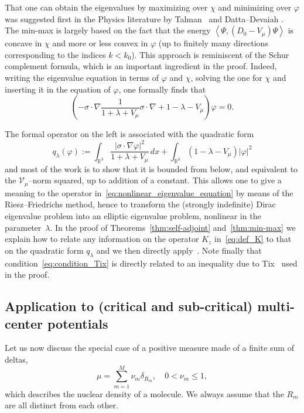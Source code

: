 \documentclass[AHL,Unicode,published]{cedram}
\newcommand{\R}{\mathbb{R}}
\newcommand{\cV}{\mathcal{V}}
\newcommand\1{{\ensuremath {\mathds 1} }}
\renewcommand\phi{\varphi}
\newcommand\pscal[1]{{\ensuremath{\left\langle #1 \right\rangle}}}
\renewcommand{\leq}{\leqslant}
\begin{document}
\goodbreak
\noindent That one can obtain the eigenvalues by maximizing over $\chi$ and minimizing over $\phi$ was suggested first in the Physics literature by Talman~\cite{Talman-86} and Datta--Devaiah \cite{DatDev-88}. The min-max is largely based on the fact that the energy $\pscal{\Psi,(D_0-V_\mu)\Psi}$ is concave in $\chi$ and more or less convex in $\phi$ (up to finitely many directions corresponding to the indices $k<k_0$). This approach is reminiscent of the Schur complement formula, which is an important ingredient in the proof. Indeed, writing the eigenvalue equation in terms of $\phi$ and $\chi$, solving the one for $\chi$ and inserting it in the equation of $\phi$, one formally finds that
\begin{equation}\label{eq:nonlinear_eigenvalue_equation}
\left(-\sigma\cdot \nabla\frac{1}{1+\lambda+V_\mu}\sigma\cdot \nabla+1-\lambda-V_\mu\right)\phi=0.
\end{equation}

The formal operator on the left is associated with the quadratic form
\begin{equation}\label{eq:def_q_lambda}
q_\lambda(\phi):=\int_{\R^3}\frac{|\sigma\cdot\nabla\phi|^2}{1+\lambda+V_\mu}\,dx+\int_{\R^3}\left(1-\lambda-V_\mu\right)|\phi|^2
\end{equation}
and most of the work is to show that it is bounded from below, and equivalent to the $\cV_\mu$--norm squared, up to addition of a constant. This allows one to give a meaning to the operator in~\eqref{eq:nonlinear_eigenvalue_equation} by means of the Riesz--Friedrichs method, hence to transform the (strongly indefinite) Dirac eigenvalue problem into an elliptic eigenvalue problem, nonlinear in the parameter~$\lambda$. In the proof of Theorems~\ref{thm:self-adjoint} and~\ref{thm:min-max} we explain how to relate any information on the operator $K_z$ in~\eqref{eq:def_K} to that on the quadratic form $q_\lambda$ and we then directly apply~\cite{DolEstSer-00,EstLewSer-19,SchSolTok-20}. Note finally that condition~\eqref{eq:condition_Tix} is directly related to an inequality due to Tix~\cite{Tix-98} used in the proof.

\subsection{Application to (critical and sub-critical) multi-center potentials}\label{sec:multicenter}

Let us now discuss the special case of a positive measure made of a finite sum of deltas,
\[
\mu=\sum_{m=1}^M\nu_m\delta_{R_m},\quad 0<\nu_m\leq1,
\]
which describes the nuclear density of a molecule. We always assume that the $R_m$ are all distinct from each other.
\end{document}
